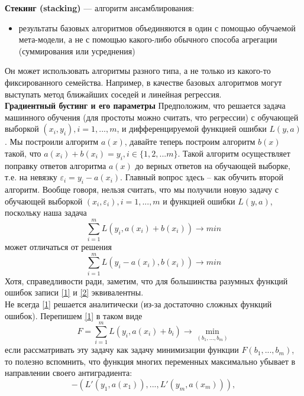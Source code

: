 \textbf{Стекинг (stacking)} — алгоритм ансамблирования:
\begin{itemize}
    \item результаты базовых алгоритмов объединяются в один с помощью обучаемой мета-модели, а не с помощью какого-либо обычного способа агрегации (суммирования или усреднения)
\end{itemize}
Он может использовать алгоритмы разного типа, а не только из какого-то фиксированного семейства. Например, в качестве базовых алгоритмов могут выступать метод ближайших соседей и линейная регрессия. \\
\textbf{Градиентный бустинг и его параметры} Предположим, что решается задача машинного обучения (для простоты можно считать, что регрессии) с обучающей выборкой $(x_i, y_i), i=1,...,m$, и дифференцируемой функцией ошибки $L(y, a)$. Мы построили алгоритм $a(x)$, давайте теперь построим алгоритм $b(x)$ такой, что $a(x_i)+b(x_i)=y_i, i \in \{1,2,...m\}.$
Такой алгоритм осуществляет поправку ответов алгоритма $a(x)$ до верных ответов на обучающей выборке, т.е. на невязку $\varepsilon_i = y_i - a(x_i)$. 
Главный вопрос здесь – как обучить второй алгоритм. Вообще говоря, нельзя считать, что мы получили новую задачу с обучающей выборкой $(x_i, \varepsilon_i), i=1,...,m$ и функцией ошибки $L(y, a)$, поскольку наша задача 
\begin{equation}\label{1}
    \displaystyle\sum_{i=1}^{m} L(y_i, a(x_i) + b(x_i)) \xrightarrow{} min
\end{equation}
может отличаться от решения
\begin{equation}\label{2}
    \displaystyle\sum_{i=1}^{m} L(y_i - a(x_i), b(x_i)) \xrightarrow{} min
\end{equation}
Хотя, справедливости ради, заметим, что для большинства разумных функций ошибок записи \ref{1} и \ref{2} эквивалентны. \\
Не всегда \ref{1} решается аналитически (из-за достаточно сложных функций ошибок). Перепишем \ref{1} в таком виде 
\begin{equation}\label{3}
    F = \displaystyle\sum_{i=1}^{m} L(y_i, a(x_i) + b_i) \xrightarrow{} \min_{(b_1, ..., b_m)}
\end{equation}
если рассматривать эту задачу как задачу минимизации функции $F(b_1, ..., b_m)$, то полезно вспомнить, что функция многих переменных максимально убывает в направлении своего антиградиента: 
\begin{equation}\label{4}
    -(L'(y_1, a(x_1)),..., L'(y_m, a(x_m))),
\end{equation}
